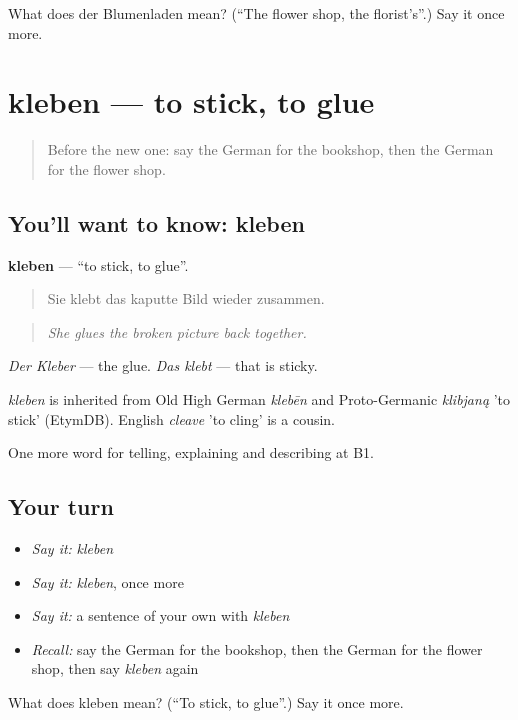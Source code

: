\begin{tcolorbox}[breakable,colback=teal!4,colframe=teal!35!black,title={Before you move on}]
What does der Blumenladen mean? (\textquotedblleft{}The flower shop, the florist's\textquotedblright{}.) Say it once more.
\end{tcolorbox}
\section[kleben]{kleben — to stick, to glue}

\label{lesson:GE-C444-kleben}



\begin{quote}
Before the new one: say the German for the bookshop, then the German for the flower shop.
\end{quote}

\subsection*{You'll want to know: kleben}
\textbf{kleben} — \textquotedblleft{}to stick, to glue\textquotedblright{}.

\begin{quote}
Sie klebt das kaputte Bild wieder zusammen.
\end{quote}

\begin{quote}
\emph{She glues the broken picture back together.}
\end{quote}

\emph{Der Kleber} — the glue. \emph{Das klebt} — that is sticky.

\begin{cousinweb}
\emph{kleben} is inherited from Old High German \emph{klebēn} and Proto-Germanic \emph{klibjaną} 'to stick' (EtymDB). English \emph{cleave} 'to cling' is a cousin.
\end{cousinweb}

\begin{grammarlens}[title={What you've built}]
One more word for telling, explaining and describing at B1.
\end{grammarlens}

\subsection*{Your turn}
\begin{itemize}
\raggedright
  \item \emph{Say it:} \emph{kleben}
  \item \emph{Say it:} \emph{kleben}, once more
  \item \emph{Say it:} a sentence of your own with \emph{kleben}
  \item \emph{Recall:} say the German for the bookshop, then the German for the flower shop, then say \emph{kleben} again
\end{itemize}

\begin{tcolorbox}[breakable,colback=teal!4,colframe=teal!35!black,title={Before you move on}]
What does kleben mean? (\textquotedblleft{}To stick, to glue\textquotedblright{}.) Say it once more.
\end{tcolorbox}
